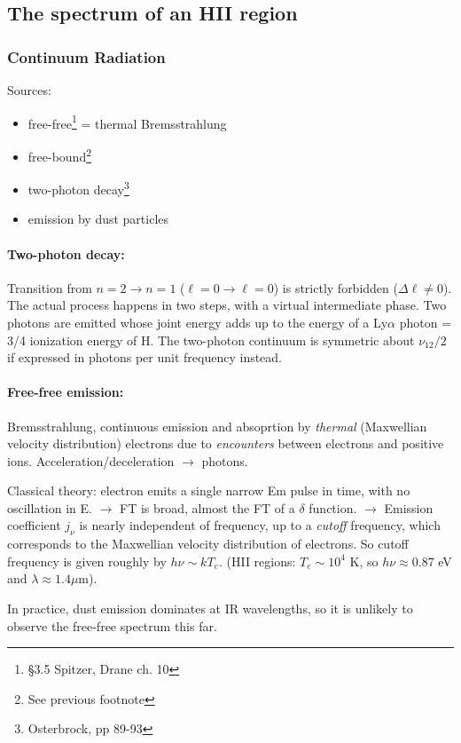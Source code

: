 \documentclass[12pt]{article}
\newcommand{\mar}[1]{\hspace{0pt}\marginpar{-\textcolor{black}{#1}-}}
\newcommand{\mynotes}[1]{\textcolor{mygreen}{#1}}
\begin{document}
\subsection{The spectrum of an HII region}
\mar{63}
\subsubsection{Continuum Radiation}
Sources:
\begin{itemize}
    \item free-free\footnote{\S{3.5} Spitzer, Drane ch. 10} = thermal
        Bremsstrahlung
    \item free-bound\footnote{See previous footnote}
    \item two-photon decay\footnote{Osterbrock, pp 89-93}
    \item emission by dust particles
\end{itemize}
\paragraph{Two-photon decay:}
Transition from $n=2 \rightarrow n=1$ ($\ell=0 \rightarrow \ell=0$) is
strictly forbidden ($\Delta\ell \neq 0$).
The actual process happens in two steps, with a virtual intermediate
phase. Two photons are emitted whose joint energy adds up to the energy
of a Ly$\alpha$ photon = 3/4 ionization energy of H. The two-photon
continuum is symmetric about $\nu_{12}/2$ if expressed in photons
per unit frequency instead.

\paragraph{Free-free emission:}
Bremsstrahlung, continuous emission and absoprtion by \emph{thermal}
(Maxwellian velocity distribution) electrons due to \emph{encounters}
between electrons and positive ions.
\mynotes{Acceleration/deceleration $\longrightarrow$ photons.}

Classical theory: electron emits a single narrow Em pulse in time,
with no oscillation in E. $\rightarrow$ FT is broad, almost the FT
of a $\delta$ function. $\rightarrow$ Emission coefficient $j_{\nu}$ is
nearly independent of frequency, up to a \emph{cutoff} frequency,
which corresponds to the Maxwellian velocity distribution of electrons.
\mar{64}So cutoff frequency is given roughly by $h\nu \sim kT_{e}$.
(HII regions: $T_{e} \sim 10^{4}$ K, so $h\nu \approx 0.87$ eV and
$\lambda \approx 1.4 \mu$m).

In practice, dust emission dominates at IR wavelengths, so it is
unlikely to observe the free-free spectrum this far.
\end{document}
